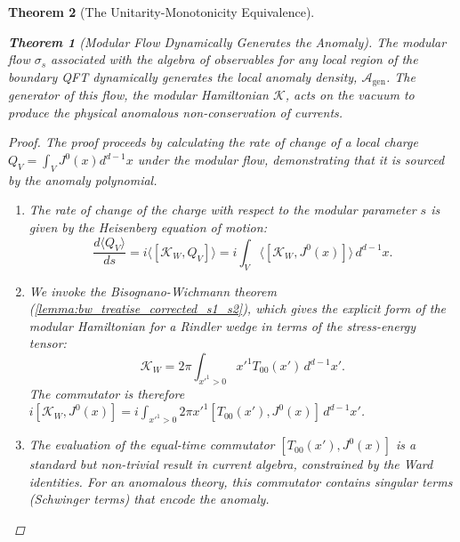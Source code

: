 \documentclass[11pt, letterpaper]{report}
\theoremstyle{plain} %
\newtheorem{theorem}{Theorem}[chapter]
\theoremstyle{definition} %
\theoremstyle{remark} %
\newcommand{\ModularK}{\mathcal{K}}
\begin{document}
\begin{theorem}[The Unitarity-Monotonicity Equivalence]
\begin{theorem}[Modular Flow Dynamically Generates the Anomaly]
\label{thm:modular_flow_drives_anomaly_c4}
The modular flow $\sigma_s$ associated with the algebra of observables for any local region of the boundary QFT dynamically generates the local anomaly density, $\mathcal{A}_{\text{gen}}$. The generator of this flow, the modular Hamiltonian $\ModularK$, acts on the vacuum to produce the physical anomalous non-conservation of currents.
\end{theorem}
\begin{proof}
The proof proceeds by calculating the rate of change of a local charge $Q_V = \int_V J^0(x) d^{d-1}x$ under the modular flow, demonstrating that it is sourced by the anomaly polynomial.
\begin{enumerate}
    \item The rate of change of the charge with respect to the modular parameter $s$ is given by the Heisenberg equation of motion:
    \begin{equation}
        \frac{d\langle Q_V \rangle}{ds} = i \langle [\ModularK_W, Q_V] \rangle = i \int_V \langle [\ModularK_W, J^0(x)] \rangle \, d^{d-1}x.
    \end{equation}
    
    \item We invoke the Bisognano-Wichmann theorem (\cref{lemma:bw_treatise_corrected_s1_s2}), which gives the explicit form of the modular Hamiltonian for a Rindler wedge in terms of the stress-energy tensor:
    \begin{equation}
        \ModularK_W = 2\pi \int_{x'^1>0} x'^1 T_{00}(x') \, d^{d-1}x'.
    \end{equation}
    The commutator is therefore $i[\ModularK_W, J^0(x)] = i \int_{x'^1>0} 2\pi x'^1 [T_{00}(x'), J^0(x)] \, d^{d-1}x'$.
    
    \item The evaluation of the equal-time commutator $[T_{00}(x'), J^0(x)]$ is a standard but non-trivial result in current algebra, constrained by the Ward identities. For an anomalous theory, this commutator contains singular terms (Schwinger terms) that encode the anomaly.
    

\end{enumerate}
\end{proof}
\end{theorem}
\end{document}
